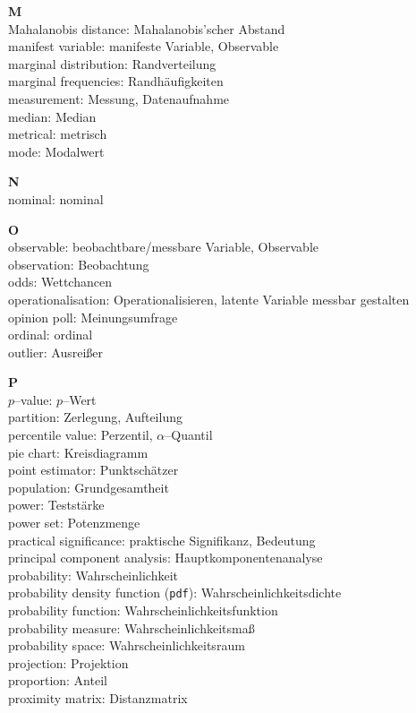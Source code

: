 \medskip
\noindent
{\bf M}\\
Mahalanobis distance: Mahalanobis'scher Abstand\\
manifest variable: manifeste Variable, Observable\\
marginal distribution: Randverteilung\\
marginal frequencies: Randh\"{a}ufigkeiten\\
measurement: Messung, Datenaufnahme\\
median: Median\\
metrical: metrisch\\
mode: Modalwert

\medskip
\noindent
{\bf N}\\
nominal: nominal

\medskip
\noindent
{\bf O}\\
observable: beobachtbare/messbare Variable, Observable\\
observation: Beobachtung\\
odds: Wettchancen \\
operationalisation: Operationalisieren, latente Variable messbar 
gestalten\\
opinion poll: Meinungsumfrage\\
ordinal: ordinal\\
outlier: Ausrei\ss er

\medskip
\noindent
{\bf P}\\
$p$--value: $p$--Wert\\
partition: Zerlegung, Aufteilung\\
percentile value: Perzentil, $\alpha$--Quantil\\
pie chart: Kreisdiagramm\\
point estimator: Punktsch\"{a}tzer\\
population: Grundgesamtheit\\
power: Testst\"{a}rke\\
power set: Potenzmenge\\
practical significance: praktische Signifikanz, Bedeutung\\
principal component analysis: Hauptkomponentenanalyse\\
probability: Wahrscheinlichkeit\\
probability density function ({\tt pdf}): 
Wahrscheinlichkeitsdichte\\
probability function: Wahrscheinlichkeitsfunktion\\
probability measure: Wahrscheinlichkeitsma\ss\\
probability space: Wahrscheinlichkeitsraum\\
projection: Projektion\\
proportion: Anteil\\
proximity matrix: Distanzmatrix


